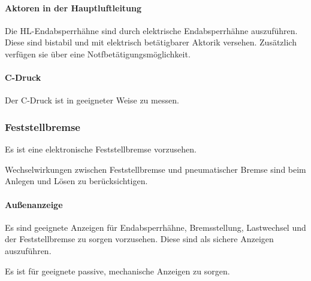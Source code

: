 \paragraph{Aktoren in der Hauptluftleitung}
\begin{feat}
Die \acrshort{HL}-Endabsperrhähne sind durch elektrische Endabsperrhähne auszuführen. Diese sind bistabil und mit elektrisch betätigbarer Aktorik versehen. Zusätzlich verfügen sie über eine Notfbetätigungsmöglichkeit.
\end{feat}

\paragraph{C-Druck}
\begin{feat}
Der C-Druck ist in geeigneter Weise zu messen.
\end{feat}

\subsubsection{Feststellbremse}
\begin{feat}
Es ist eine elektronische Feststellbremse vorzusehen.
\end{feat}
\begin{rem}[zu Anf. 25]
Wechselwirkungen zwischen Feststellbremse und pneumatischer Bremse sind beim Anlegen und Lösen zu berücksichtigen.
\end{rem}

\paragraph{Außenanzeige}
\begin{feat}
Es sind geeignete Anzeigen für Endabsperrhähne, Bremsstellung, \gls{Lastwechsel} und der Feststellbremse zu sorgen vorzusehen. Diese sind als sichere Anzeigen auszuführen.
\end{feat}
\begin{feat}
Es ist für geeignete passive, mechanische Anzeigen zu sorgen.
\end{feat}


